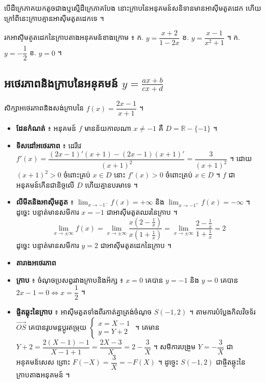 \begin{note}[សម្គាល់]
បើដឺក្រេភាគយកតូចជាងឬស្មើដឺក្រេភាគបែង នោះក្រាបនៃអនុគមន៍សនិទានមានអាស៊ីមតូតដេក ហើយក្រៅពីនេះក្រាបគ្មានអាស៊ីមតូតដេកទេ ។
\end{note}

\begin{pro}
រកអាស៊ីមតូតដេកនៃក្រាបតាងអនុគមន៍ខាងក្រោម ៖ \quad ក. $y = \dfrac{x + 2}{1 - 2x}$ \quad ខ. $y = \dfrac{x - 1}{x^2 + 1}$ ។
\ans
ក. $y = -\dfrac{1}{2}$ \quad ខ. $y = 0$ ។
\end{pro}

\subsection{អថេរភាពនិងក្រាបនៃអនុគមន៍ \texorpdfstring{$y = \frac{ax + b}{cx + d}$}{y = (ax+b)/(cx+d)}}

\begin{example}[ឧទាហរណ៍]
សិក្សាអថេរភាពនិងសង់ក្រាបនៃ $f(x) = \dfrac{2x - 1}{x + 1}$ ។
\end{example}
\begin{itemize}
  \item \textbf{ដែនកំណត់} ៖ អនុគមន៍ $f$ មានន័យកាលណា $x \ne -1$ គឺ $D = \mathbb{R} - \{-1\}$ ។
  \item \textbf{ទិសដៅអថេរភាព} ៖ ដេរីវេ $f'(x) = \dfrac{(2x - 1)'(x + 1) - (2x - 1)(x + 1)'}{(x + 1)^2} = \dfrac{3}{(x + 1)^2}$ ។ ដោយ $(x + 1)^2 > 0$ ចំពោះគ្រប់ $x \in D$ នោះ $f'(x) > 0$ ចំពោះគ្រប់ $x \in D$ ។ $f$ ជាអនុគមន៍កើនជានិច្ចលើ $D$ ហើយគ្មានបរមាទេ ។
  \item \textbf{លីមីតនិងអាស៊ីមតូត} ៖ $\displaystyle\lim_{x \to -1^-} f(x) = +\infty$ និង $\displaystyle\lim_{x \to -1^+} f(x) = -\infty$ ។ ដូច្នេះ បន្ទាត់មានសមីការ $x = -1$ ជាអាស៊ីមតូតឈរនៃក្រាប ។
  \[ \lim_{x \to \pm\infty} f(x) = \lim_{x \to \pm\infty}\frac{x\left(2 - \frac{1}{x}\right)}{x\left(1 + \frac{1}{x}\right)} = \lim_{x \to \pm\infty}\frac{2 - \frac{1}{x}}{1 + \frac{1}{x}} = 2 \]
  ដូច្នេះ បន្ទាត់មានសមីការ $y = 2$ ជាអាស៊ីមតូតដេកនៃក្រាប ។
  \item \textbf{តារាងអថេរភាព}
  \begin{center}
  \end{center}
  \item \textbf{ក្រាប} ៖ ចំណុចប្រសព្វរវាងក្រាបនិងអ័ក្ស ៖ $x = 0$ គេបាន $y = -1$ និង $y = 0$ គេបាន $2x - 1 = 0 \Leftrightarrow x = \dfrac{1}{2}$ ។
  \item \textbf{ផ្ចិតឆ្លុះនៃក្រាប} ៖ អាស៊ីមតូតទាំងពីរកាត់គ្នាត្រង់ចំណុច $S(-1, 2)$ ។ តាមការបំប្លែងកិលវិចទ័រ $\overrightarrow{OS}$ គេបានរូបមន្តប្ដូរតម្រុយ $\begin{cases} x = X - 1\\ y = Y + 2 \end{cases}$ ។ គេមាន $Y + 2 = \dfrac{2(X - 1) - 1}{X - 1 + 1} = \dfrac{2X - 3}{X} = 2 - \dfrac{3}{X}$ ។ សមីការបង្រួម $Y = -\dfrac{3}{X}$ ជាអនុគមន៍សេស ព្រោះ $F(-X) = \dfrac{3}{X} = -F(X)$ ។ ដូច្នេះ $S(-1, 2)$ ជាផ្ចិតឆ្លុះនៃក្រាបតាងអនុគមន៍ ។
\end{itemize}

